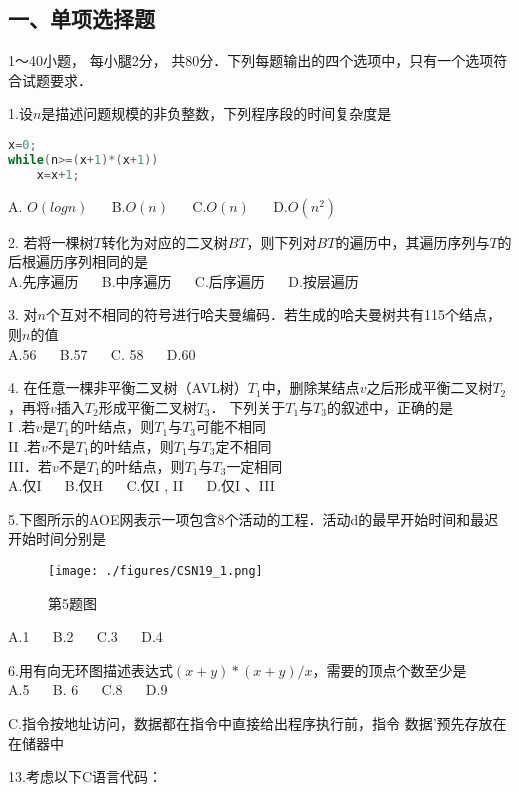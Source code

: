 
\subsection{一、单项选择题}
1～40小题， 每小腿2分， 共80分．下列每题输出的四个选项中，只有一个选项符合试题要求．

1.设$n$是描述问题规模的非负整数，下列程序段的时间复杂度是
\begin{lstlisting}[language=cpp]
x=0;
while(n>=(x+1)*(x+1))
    x=x+1;
\end{lstlisting}
A. $O(logn)$  $\quad$  B.$O(n)$  $\quad$   C.$O(n)$  $\quad$  D.$O(n^2)$

2. 若将一棵树$T$转化为对应的二叉树$BT$，则下列对$BT$的遍历中，其遍历序列与$T$的后根遍历序列相同的是 \\
A.先序遍历  $\quad$  B.中序遍历  $\quad$  C.后序遍历  $\quad$ D.按层遍历

3. 对$n$个互对不相同的符号进行哈夫曼编码．若生成的哈夫曼树共有115个结点，则$n$的值 \\
A.56  $\quad$  B.57  $\quad$  C. 58  $\quad$  D.60

4. 在任意一棵非平衡二叉树（AVL树）$T_1$中，删除某结点$v$之后形成平衡二叉树$T_2$，再将$v$插入$T_2$形成平衡二叉树$T_3$． 下列关于$T_1$与$T_3$的叙述中，正确的是 \\
I .若$v$是$T_1$的叶结点，则$T_1$与$T_3$可能不相同 \\
II .若$v$不是$T_1$的叶结点，则$T_1$与$T_3$定不相同  \\
III．若$v$不是$T_1$的叶结点，则$T_1$与$T_3$一定相同 \\
A.仅I  $\quad$  B.仅H  $\quad$ C.仅I , II  $\quad$  D.仅I 、III

5.下图所示的AOE网表示一项包含8个活动的工程．活动d的最早开始时间和最迟开始时间分别是
\begin{figure}[ht]
\centering
\texttt{[image: ./figures/CSN19\_1.png]}
\caption{第5题图} \label{CSN19_fig1}
\end{figure}
A.1  $\quad$  B.2  $\quad$  C.3  $\quad$  D.4

6.用有向无环图描述表达式$(x+y)*(x+y)/x$，需要的顶点个数至少是 \\
A.5  $\quad$  B. 6  $\quad$  C.8  $\quad$  D.9

    C.指令按地址访问，数据都在指令中直接给出程序执行前，指令   数据'预先存放在在储器中


    13.考虑以下C语言代码：

